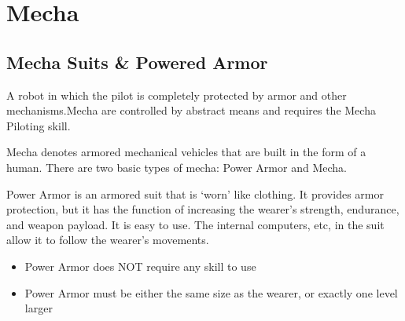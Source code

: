 \documentclass[twoside]{book}
\begin{document}
\begin{multicols}{2}
    


\hspace{-2ex}
\vspace{1ex}


    
\end{multicols}
  
    

\chapter{Mecha}
    
    

\section{Mecha Suits \& Powered Armor}
    
    {  
     A robot in which the pilot is completely protected by
             armor and other mechanisms.Mecha are controlled by abstract
             means and requires the Mecha Piloting skill. 
    }
  
    {  
     Mecha denotes armored mechanical vehicles that are
             built in the form of a human. There are two basic types of
             mecha: Power Armor and Mecha. 
    }
  
    {  
     Power Armor is an armored suit that is
             `worn' like clothing. It provides armor
             protection, but it has the function of increasing the
             wearer's strength, endurance, and weapon payload. It
             is easy to use. The internal computers, etc, in the suit
             allow it to follow the wearer's movements. 
    }
  
\begin{itemize}
      
  \item  Power Armor does NOT require any skill to use
               
  \item  Power Armor must be either the same size as the
               wearer, or exactly one level larger 
\end{itemize}
  
\end{document}
